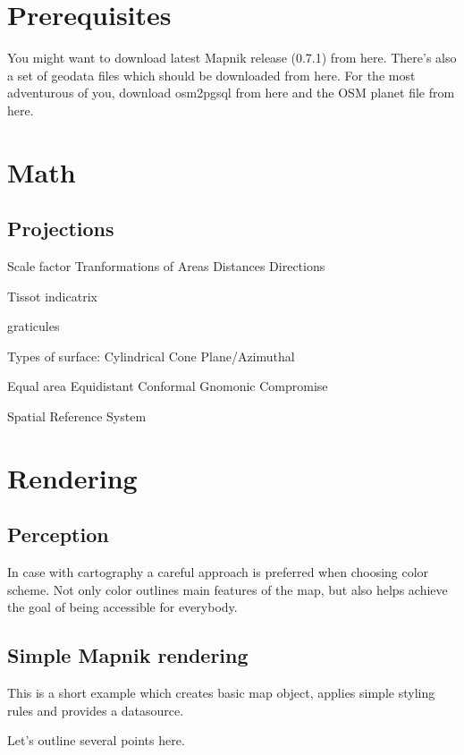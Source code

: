 \documentclass{article}
\begin{document}
\section{Prerequisites}

You might want to download latest Mapnik release (0.7.1) from here.
There's also a set of geodata files which should be downloaded from here.
For the most adventurous of you, download osm2pgsql from here and the OSM planet file from here.

\section{Math}

\subsection{Projections}

Scale factor
Tranformations of
Areas
Distances
Directions

Tissot indicatrix

graticules


Types of surface:
Cylindrical
Cone
Plane/Azimuthal

Equal area
Equidistant
Conformal
Gnomonic
Compromise

Spatial Reference System


\section{Rendering}

\subsection{Perception}

In case with cartography a careful approach is preferred when choosing
color scheme. Not only color outlines main features of the map, but also
helps achieve the goal of being accessible for everybody.

\subsection{Simple Mapnik rendering}

This is a short example which creates basic map object, applies simple styling
rules and provides a datasource.



Let's outline several points here.
\end{document}
